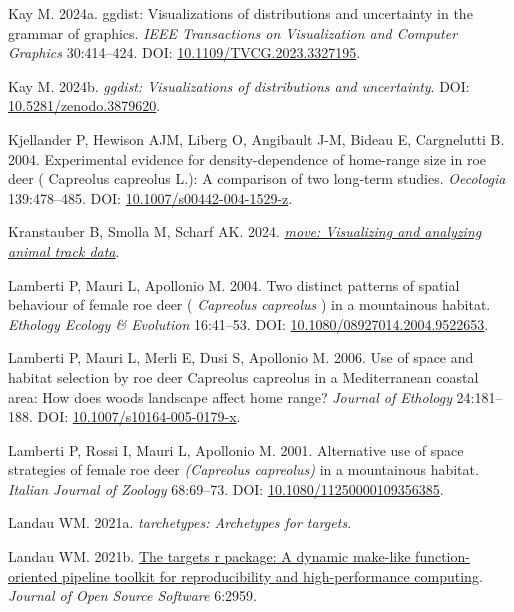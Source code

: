 \documentclass[10pt,a4paper]{article}
\newlength{\cslhangindent}
\newenvironment{CSLReferences}[2] %
 {\begin{list}{}{%
  \setlength{\itemindent}{0pt}
  \setlength{\leftmargin}{0pt}
  \setlength{\parsep}{0pt}
  \ifodd #1
   \setlength{\leftmargin}{\cslhangindent}
   \setlength{\itemindent}{-1\cslhangindent}
  \fi
  \setlength{\itemsep}{#2\baselineskip}}}
 {\end{list}}
\begin{document}
\begin{CSLReferences}{1}{0}
Kay M. 2024a. {ggdist}: Visualizations of distributions and uncertainty in the grammar of graphics. \emph{IEEE Transactions on Visualization and Computer Graphics} 30:414--424. DOI: \href{https://doi.org/10.1109/TVCG.2023.3327195}{10.1109/TVCG.2023.3327195}.

Kay M. 2024b. \emph{{ggdist}: Visualizations of distributions and uncertainty}. DOI: \href{https://doi.org/10.5281/zenodo.3879620}{10.5281/zenodo.3879620}.

Kjellander P, Hewison AJM, Liberg O, Angibault J-M, Bideau E, Cargnelutti B. 2004. Experimental evidence for density-dependence of home-range size in roe deer ( {Capreolus} capreolus {L}.): A comparison of two long-term studies. \emph{Oecologia} 139:478--485. DOI: \href{https://doi.org/10.1007/s00442-004-1529-z}{10.1007/s00442-004-1529-z}.

Kranstauber B, Smolla M, Scharf AK. 2024. \emph{\href{https://CRAN.R-project.org/package=move}{{move}: Visualizing and analyzing animal track data}}.

Lamberti P, Mauri L, Apollonio M. 2004. Two distinct patterns of spatial behaviour of female roe deer ( \emph{{Capreolus} capreolus} ) in a mountainous habitat. \emph{Ethology Ecology \& Evolution} 16:41--53. DOI: \href{https://doi.org/10.1080/08927014.2004.9522653}{10.1080/08927014.2004.9522653}.

Lamberti P, Mauri L, Merli E, Dusi S, Apollonio M. 2006. Use of space and habitat selection by roe deer {Capreolus} capreolus in a {Mediterranean} coastal area: How does woods landscape affect home range? \emph{Journal of Ethology} 24:181--188. DOI: \href{https://doi.org/10.1007/s10164-005-0179-x}{10.1007/s10164-005-0179-x}.

Lamberti P, Rossi I, Mauri L, Apollonio M. 2001. Alternative use of space strategies of female roe deer \emph{({Capreolus} capreolus)} in a mountainous habitat. \emph{Italian Journal of Zoology} 68:69--73. DOI: \href{https://doi.org/10.1080/11250000109356385}{10.1080/11250000109356385}.

Landau WM. 2021a. \emph{{tarchetypes}: Archetypes for targets}.

Landau WM. 2021b. \href{https://doi.org/10.21105/joss.02959}{The targets r package: A dynamic make-like function-oriented pipeline toolkit for reproducibility and high-performance computing}. \emph{Journal of Open Source Software} 6:2959.


\end{CSLReferences}
\end{document}
